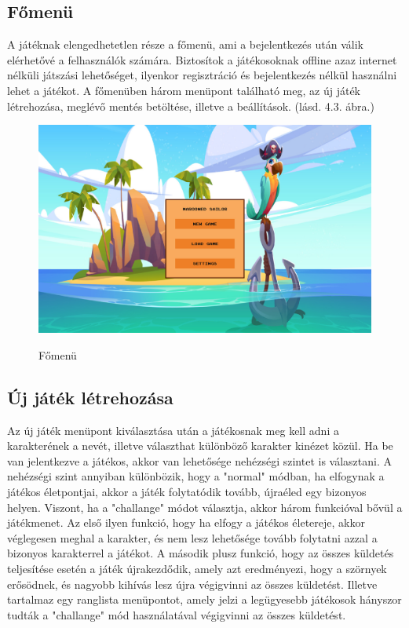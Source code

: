 \subsection{Főmenü}

\indent \indent A játéknak elengedhetetlen része a főmenü, ami a bejelentkezés után válik elérhetővé a felhasználók számára. Biztosítok a játékosoknak offline azaz internet nélküli játszási lehetőséget, ilyenkor regisztráció és bejelentkezés nélkül használni lehet a játékot.
A főmenüben három menüpont található meg, az új játék létrehozása, meglévő mentés betöltése, illetve a beállítások. (lásd. 4.3. ábra.)   



\begin{figure}[H]
    \centering
    \includegraphics[width=15.0truecm]{images/mainmenu.png}
    \caption{Főmenü}
    \label{fig:Főmenü}\cite{Főmenü}
\end{figure}



\subsection{Új játék létrehozása}
\indent \indent Az új játék menüpont kiválasztása után a játékosnak meg kell adni a karakterének a nevét, illetve választhat különböző karakter kinézet közül. Ha be van jelentkezve a játékos, akkor van lehetősége nehézségi szintet is választani.
A nehézségi szint annyiban különbözik, hogy a "normal" módban, ha elfogynak a játékos életpontjai, akkor a játék folytatódik tovább, újraéled egy bizonyos helyen. Viszont, ha a "challange"  módot választja, akkor három funkcióval bővül a játékmenet. Az első ilyen funkció, hogy ha elfogy a játékos életereje, akkor véglegesen meghal a karakter, és nem lesz lehetősége tovább folytatni azzal a bizonyos karakterrel a játékot. A második plusz funkció, hogy az összes küldetés teljesítése esetén a játék újrakezdődik, amely azt eredményezi, hogy a szörnyek erősödnek, és nagyobb kihívás lesz újra végigvinni az összes küldetést. Illetve tartalmaz egy ranglista menüpontot, amely jelzi a legügyesebb játékosok hányszor tudták a "challange" mód használatával végigvinni az összes küldetést. 

